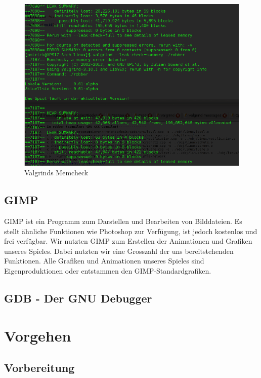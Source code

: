 \documentclass[11pt,a4paper]{scrbook}
\begin{document}
\begin{figure}
\centering
\includegraphics[scale=0.5]{img/valgrind2.png}
\caption{Valgrinds Memcheck}
\end{figure}


\section{GIMP}
GIMP ist ein Programm zum Darstellen und Bearbeiten von Bilddateien.
Es stellt ähnliche Funktionen wie Photoshop zur Verfügung, ist jedoch kostenlos und frei verfügbar.
Wir nutzten GIMP zum Erstellen der Animationen und Grafiken unseres Spieles.
Dabei nutzten wir eine Grosszahl der uns bereitstehenden Funktionen.
Alle Grafiken und Animationen unseres Spieles sind Eigenproduktionen oder entstammen den GIMP-Standardgrafiken.
\section{GDB - Der GNU Debugger}


\chapter{Vorgehen}
\section{Vorbereitung}
\end{document}

